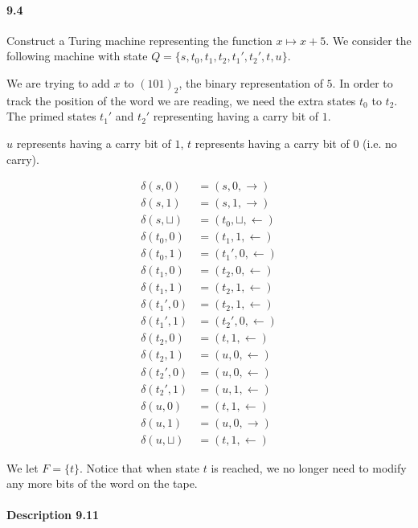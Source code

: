 \documentclass{article}
\begin{document}
\paragraph{9.4} Construct a Turing machine representing the function $x\mapsto x+5$. We consider the following machine with state $Q=\{s,t_0,t_1,t_2,t_1',t_2',t,u\}$.

We are trying to add $x$ to $(101)_2$, the binary representation of $5$. In order to track the position of the word we are reading, we need the extra states $t_0$ to $t_2$. The primed states $t_1'$ and $t_2'$ representing having a carry bit of $1$.

$u$ represents having a carry bit of $1$, $t$ represents having a carry bit of $0$ (i.e. no carry).

\begin{align*}
	\delta(s,0)&=(s,0,\rightarrow)\\
	\delta(s,1)&=(s,1,\rightarrow)\\
	\delta(s,\sqcup)&=(t_0,\sqcup,\leftarrow)\\
	\delta(t_0,0)&=(t_1,1,\leftarrow)\\
	\delta(t_0,1)&=(t_1',0,\leftarrow)\\
	\delta(t_1,0)&=(t_2,0,\leftarrow)\\
	\delta(t_1,1)&=(t_2,1,\leftarrow)\\
	\delta(t_1',0)&=(t_2,1,\leftarrow)\\
	\delta(t_1',1)&=(t_2',0,\leftarrow)\\
	\delta(t_2,0)&=(t,1,\leftarrow)\\
	\delta(t_2,1)&=(u,0,\leftarrow)\\
	\delta(t_2',0)&=(u,0,\leftarrow)\\
	\delta(t_2',1)&=(u,1,\leftarrow)\\
	\delta(u,0)&=(t,1,\leftarrow)\\
	\delta(u,1)&=(u,0,\rightarrow)\\
	\delta(u,\sqcup)&=(t,1,\leftarrow)
\end{align*}

We let $F=\{t\}$. Notice that when state $t$ is reached, we no longer need to modify any more bits of the word on the tape.



\paragraph{Description 9.11}\mbox{}
\end{document}
